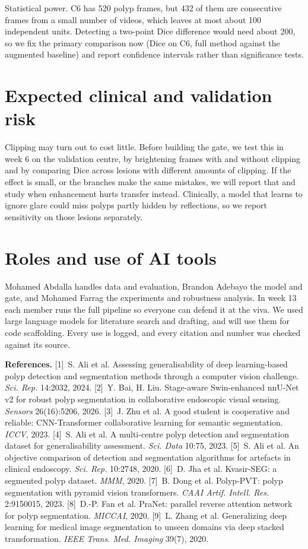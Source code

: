 \documentclass[10pt,a4paper]{article}
\begin{document}
Statistical power. C6 has 520 polyp frames, but 432 of them are consecutive frames from a small number of videos, which leaves at most about 100 independent units. Detecting a two-point
Dice difference would need about 200, so we fix the primary comparison now (Dice on C6, full method
against the augmented baseline) and report confidence intervals rather than significance tests.

\section{Expected clinical and validation risk}

Clipping may turn out to cost little. Before building the gate, we test this in week 6 on the
validation centre, by brightening frames with and without clipping and by comparing Dice across
lesions with different amounts of clipping. If the effect is small, or the branches make the same
mistakes, we will report that and study when enhancement hurts transfer instead. Clinically, a model
that learns to ignore glare could miss polyps partly hidden by reflections, so we report sensitivity
on those lesions separately.

\section{Roles and use of AI tools}

Mohamed Abdalla handles data and evaluation, Brandon Adebayo the model and gate, and Mohamed Farrag
the experiments and robustness analysis. In week 13 each member runs the full pipeline so everyone
can defend it at the viva. We used large language models for literature search and drafting, and will use them for code scaffolding. Every use is logged, and every citation and number was checked against its source.

\vspace{4pt}
{\footnotesize\sloppy
\noindent\textbf{References.}
[1]~S. Ali et al. Assessing generalisability of deep learning-based polyp detection and segmentation
methods through a computer vision challenge. \emph{Sci. Rep.} 14:2032, 2024.
[2]~Y. Bai, H. Liu. Stage-aware Swin-enhanced nnU-Net v2 for robust polyp segmentation in
collaborative endoscopic visual sensing. \emph{Sensors} 26(16):5206, 2026.
[3]~J. Zhu et al. A good student is cooperative and reliable: CNN-Transformer collaborative learning
for semantic segmentation. \emph{ICCV}, 2023.
[4]~S. Ali et al. A multi-centre polyp detection and segmentation dataset for generalisability
assessment. \emph{Sci. Data} 10:75, 2023.
[5]~S. Ali et al. An objective comparison of detection and segmentation algorithms for artefacts in
clinical endoscopy. \emph{Sci. Rep.} 10:2748, 2020.
[6]~D. Jha et al. Kvasir-SEG: a segmented polyp dataset. \emph{MMM}, 2020.
[7]~B. Dong et al. Polyp-PVT: polyp segmentation with pyramid vision transformers.
\emph{CAAI Artif. Intell. Res.} 2:9150015, 2023.
[8]~D.-P. Fan et al. PraNet: parallel reverse attention network for polyp segmentation.
\emph{MICCAI}, 2020.
[9]~L. Zhang et al. Generalizing deep learning for medical image segmentation to unseen domains via
deep stacked transformation. \emph{IEEE Trans. Med. Imaging} 39(7), 2020.\par}
\end{document}
